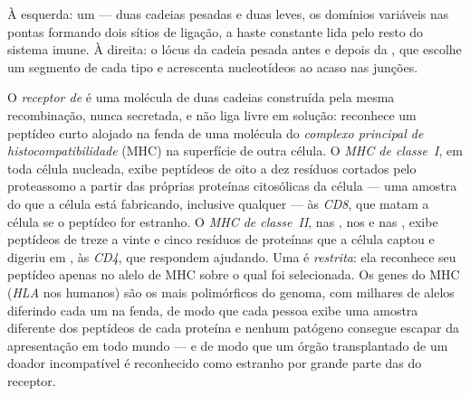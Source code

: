 \begin{omfigure}
{\small À esquerda: um  --- duas cadeias pesadas e duas leves,
os domínios variáveis nas pontas formando dois sítios de ligação, a
haste constante lida pelo resto do sistema imune. À direita: o lócus da
cadeia pesada antes e depois da , que escolhe um
segmento de cada tipo e acrescenta nucleotídeos ao acaso nas junções.}
\end{omfigure}

\begin{definition}\label{def:b3:adaptive-immunity:mhc}
O \emph{receptor de } é uma molécula de duas cadeias
construída pela mesma recombinação, nunca secretada, e não liga
 livre em solução: reconhece um peptídeo curto alojado na fenda
de uma molécula do \emph{complexo principal de histocompatibilidade}
(MHC) na superfície de outra célula. O \emph{MHC de classe~I}, em toda
célula nucleada, exibe peptídeos de oito a dez resíduos cortados pelo
proteassomo a partir das próprias proteínas citosólicas da célula ---
uma amostra do que a célula está fabricando, inclusive qualquer 
--- às  \emph{CD8}, que matam a célula se o peptídeo for
estranho. O \emph{MHC de classe~II}, nas , nos
 e nas , exibe peptídeos de treze a vinte e cinco
resíduos de proteínas que a célula captou e digeriu em , às
 \emph{CD4}, que respondem ajudando. Uma  é
\emph{restrita}: ela reconhece seu peptídeo apenas no alelo de MHC sobre
o qual foi selecionada. Os genes do MHC (\emph{HLA} nos humanos) são os
mais polimórficos do genoma, com milhares de alelos diferindo cada um
na fenda, de modo que cada pessoa exibe uma amostra diferente dos
peptídeos de cada proteína e nenhum patógeno consegue escapar da
apresentação em todo mundo --- e de modo que um órgão transplantado de
um doador incompatível é reconhecido como estranho por grande parte das
 do receptor.
\end{definition}

